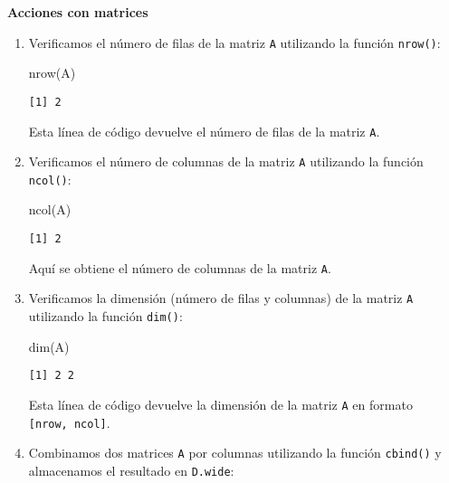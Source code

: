 \documentclass[
  a4paper,
]{article}
\newenvironment{Shaded}{}{}
\newcommand{\FunctionTok}[1]{\textcolor[rgb]{0.44,0.26,0.76}{#1}}
\newcommand{\NormalTok}[1]{\textcolor[rgb]{0.14,0.16,0.18}{#1}}
\begin{document}
\textbf{Acciones con matrices}

\begin{enumerate}
\def\labelenumi{\arabic{enumi}.}
\item
  Verificamos el número de filas de la matriz \texttt{A} utilizando la
  función \texttt{nrow()}:

\begin{Shaded}
\begin{Highlighting}[]
\FunctionTok{nrow}\NormalTok{(A)}
\end{Highlighting}
\end{Shaded}

\begin{verbatim}
[1] 2
\end{verbatim}

  Esta línea de código devuelve el número de filas de la matriz
  \texttt{A}.
\item
  Verificamos el número de columnas de la matriz \texttt{A} utilizando
  la función \texttt{ncol()}:

\begin{Shaded}
\begin{Highlighting}[]
\FunctionTok{ncol}\NormalTok{(A)}
\end{Highlighting}
\end{Shaded}

\begin{verbatim}
[1] 2
\end{verbatim}

  Aquí se obtiene el número de columnas de la matriz \texttt{A}.
\item
  Verificamos la dimensión (número de filas y columnas) de la matriz
  \texttt{A} utilizando la función \texttt{dim()}:

\begin{Shaded}
\begin{Highlighting}[]
\FunctionTok{dim}\NormalTok{(A)}
\end{Highlighting}
\end{Shaded}

\begin{verbatim}
[1] 2 2
\end{verbatim}

  Esta línea de código devuelve la dimensión de la matriz \texttt{A} en
  formato \texttt{{[}nrow,\ ncol{]}}.
\item
  Combinamos dos matrices \texttt{A} por columnas utilizando la función
  \texttt{cbind()} y almacenamos el resultado en \texttt{D.wide}:


\end{enumerate}
\end{document}
